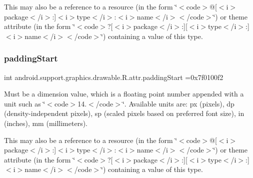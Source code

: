 This may also be a reference to a resource (in the form \char`\"{}$<$code$>$@\mbox{[}$<$i$>$package$<$/i$>$\+:\mbox{]}$<$i$>$type$<$/i$>$\+:$<$i$>$name$<$/i$>$$<$/code$>$\char`\"{}) or theme attribute (in the form \char`\"{}$<$code$>$?\mbox{[}$<$i$>$package$<$/i$>$\+:\mbox{]}\mbox{[}$<$i$>$type$<$/i$>$\+:\mbox{]}$<$i$>$name$<$/i$>$$<$/code$>$\char`\"{}) containing a value of this type. \mbox{\label{classandroid_1_1support_1_1graphics_1_1drawable_1_1R_1_1attr_a4c27ae123064fb2be391175bdb4b4879}} 
\subsubsection{\texorpdfstring{padding\+Start}{paddingStart}}
{\footnotesize\ttfamily int android.\+support.\+graphics.\+drawable.\+R.\+attr.\+padding\+Start =0x7f0100f2\hspace{0.3cm}{\ttfamily [static]}}

Must be a dimension value, which is a floating point number appended with a unit such as \char`\"{}$<$code$>$14.\+5sp$<$/code$>$\char`\"{}. Available units are\+: px (pixels), dp (density-\/independent pixels), sp (scaled pixels based on preferred font size), in (inches), mm (millimeters). 

This may also be a reference to a resource (in the form \char`\"{}$<$code$>$@\mbox{[}$<$i$>$package$<$/i$>$\+:\mbox{]}$<$i$>$type$<$/i$>$\+:$<$i$>$name$<$/i$>$$<$/code$>$\char`\"{}) or theme attribute (in the form \char`\"{}$<$code$>$?\mbox{[}$<$i$>$package$<$/i$>$\+:\mbox{]}\mbox{[}$<$i$>$type$<$/i$>$\+:\mbox{]}$<$i$>$name$<$/i$>$$<$/code$>$\char`\"{}) containing a value of this type. \mbox{\label{classandroid_1_1support_1_1graphics_1_1drawable_1_1R_1_1attr_a41243e726037a0464a7b80049c997917}} 
